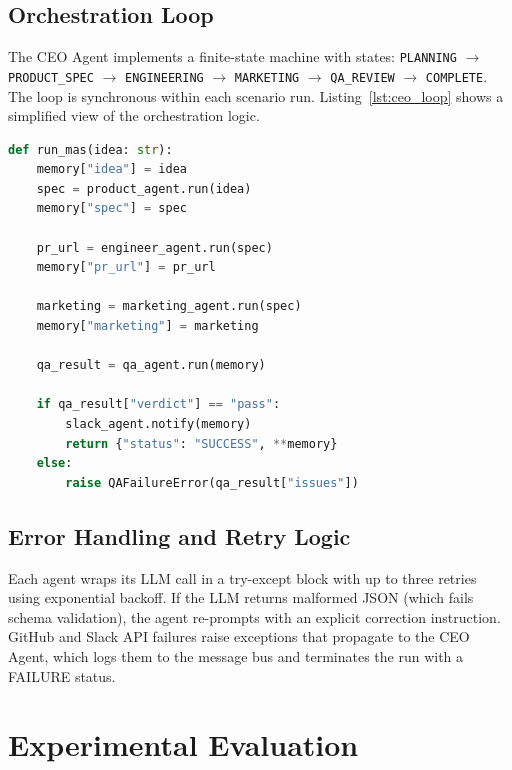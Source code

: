 \documentclass[conference]{IEEEtran}
\begin{document}
\subsection{Orchestration Loop}

The CEO Agent implements a finite-state machine with states: \texttt{PLANNING} $\rightarrow$ \texttt{PRODUCT\_SPEC} $\rightarrow$ \texttt{ENGINEERING} $\rightarrow$ \texttt{MARKETING} $\rightarrow$ \texttt{QA\_REVIEW} $\rightarrow$ \texttt{COMPLETE}. The loop is synchronous within each scenario run. Listing~\ref{lst:ceo_loop} shows a simplified view of the orchestration logic.

\begin{lstlisting}[language=Python, caption={Simplified CEO Orchestration Loop}, label={lst:ceo_loop}]
def run_mas(idea: str):
    memory["idea"] = idea
    spec = product_agent.run(idea)
    memory["spec"] = spec
    
    pr_url = engineer_agent.run(spec)
    memory["pr_url"] = pr_url
    
    marketing = marketing_agent.run(spec)
    memory["marketing"] = marketing
    
    qa_result = qa_agent.run(memory)
    
    if qa_result["verdict"] == "pass":
        slack_agent.notify(memory)
        return {"status": "SUCCESS", **memory}
    else:
        raise QAFailureError(qa_result["issues"])
\end{lstlisting}

\subsection{Error Handling and Retry Logic}

Each agent wraps its LLM call in a try-except block with up to three retries using exponential backoff. If the LLM returns malformed JSON (which fails schema validation), the agent re-prompts with an explicit correction instruction. GitHub and Slack API failures raise exceptions that propagate to the CEO Agent, which logs them to the message bus and terminates the run with a FAILURE status.

\section{Experimental Evaluation}
\label{sec:eval}
\end{document}
